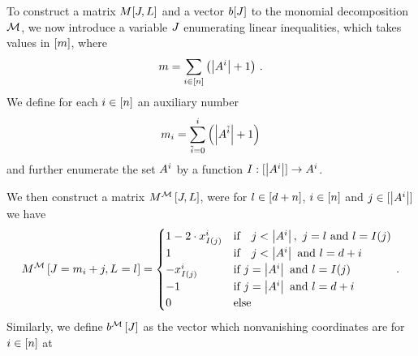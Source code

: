 To construct a matrix $M[J,L]$ and a vector $b[J]$ to the monomial decomposition $\mathcal{M}$, we now introduce a variable $J$ enumerating linear inequalities, which takes values in $[m]$, where
\[ m =  \sum_{i\in[n]} \left(\left|A^{i}\right| +1\right) \, . \]
We define for each $i\in[n]$ an auxiliary number
\[ m_{i} = \sum_{\tilde{i}=0}^{i} \left(\left|A^{\tilde{i}}\right| +1\right) \]
and further enumerate the set $A^{i}$ by a function $I: [\left|A^{i}\right|] \rightarrow A^{i}$.

We then construct a matrix $M^{\mathcal{M}}\left[J,L\right]$, were for $l\in[d+n]$, $i\in[n]$ and $j\in[\left|A^{i}\right|]$ we have
\begin{align}
    \label{eq:ilpMatrix}
    \matrixofat{\sliceset}{\datvariable=\datanum_{\decindex}+\datindex,\indexedselvariable} =
    \begin{cases}
        1 - 2 \cdot \catindexof{\indexinterpretationat{\datindex}}^{\decindex} & \ifspace \datindex < \cardof{\variablesetof{\decindex}}, \,\, \datindex=\selindex \text{  and  } \selindex = \indexinterpretationat{\datindex} \\ %
        1  & \ifspace \datindex < \cardof{\variablesetof{\decindex}} \text{  and  } \selindex = \catorder + \decindex \\ %
        -\catindexof{\indexinterpretationat{\datindex}}^{\decindex} & \text{if }  \datindex = \cardof{\variablesetof{\decindex}}    \text{ and }  \selindex=\indexinterpretationat{\datindex}  \\ %
        -1 & \text{if }  \datindex = \cardof{\variablesetof{\decindex}}  \text{ and }  \selindex = \catorder + \decindex \\ %
        0 & \text{else} \\
    \end{cases} \, .
\end{align}
Similarly, we define $b^{\mathcal{M}}\left[J\right]$ as the vector which nonvanishing coordinates are for $i\in[n]$ at
